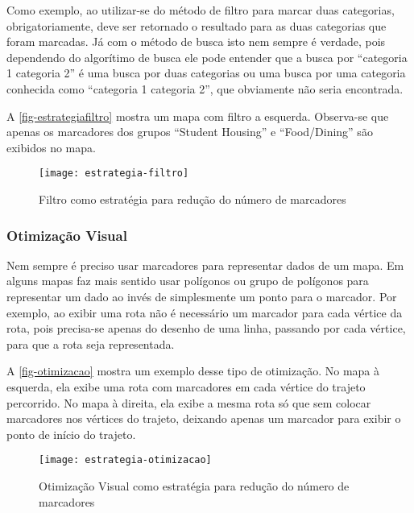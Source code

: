 	Como exemplo, ao utilizar-se do método de filtro para marcar duas categorias, obrigatoriamente, deve ser retornado o resultado para as duas categorias que foram marcadas. Já com o método de busca isto nem sempre é verdade, pois dependendo do algorítimo de busca ele pode entender que a busca por ``categoria 1 categoria 2'' é uma busca por duas categorias ou uma busca por uma categoria conhecida como ``categoria 1 categoria 2'', que obviamente não seria encontrada. 
		
	A \autoref{fig-estrategiafiltro} mostra um mapa com filtro a esquerda. Observa-se que apenas os marcadores dos grupos  ``Student Housing'' e ``Food/Dining''  são exibidos no mapa.
	 \begin{figure}[htb]
	\caption{\label{fig-estrategiafiltro}Filtro como estratégia para redução do número de marcadores}
	\begin{center}
	    \texttt{[image: estrategia-filtro]}
	\end{center}
	\end{figure}
	 
	\subsubsection{Otimização Visual}
	Nem sempre é preciso usar marcadores para representar dados de um mapa. Em alguns mapas faz mais sentido usar polígonos ou grupo de polígonos para representar um dado ao invés de simplesmente um ponto para o marcador. Por exemplo, ao exibir uma rota  não é necessário um marcador para cada vértice da rota, pois precisa-se apenas do desenho de uma linha, passando por cada vértice, para que a rota seja representada.
	
	A \autoref{fig-otimizacao} mostra um exemplo desse tipo de otimização. No mapa à esquerda, ela exibe uma rota com marcadores em cada vértice do trajeto percorrido. No mapa à direita, ela exibe a mesma rota só que sem colocar marcadores nos vértices do trajeto, deixando apenas um marcador para exibir o ponto de início do trajeto.
	
	 \begin{figure}[htb]
	\caption{\label{fig-otimizacao}Otimização Visual como estratégia para redução do número de marcadores}
	\begin{center}
	    \texttt{[image: estrategia-otimizacao]}
	\end{center}
	\end{figure}
	
